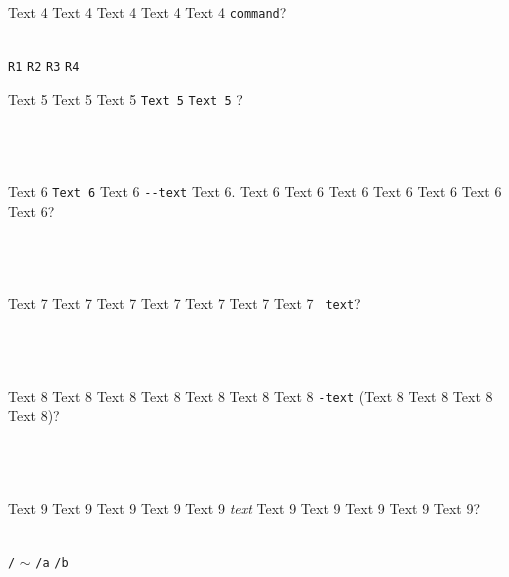 \documentclass[9pt]{exam}
\begin{document}
\begin{questions}
\question
    Text 4 Text 4 Text 4 Text 4 Text 4 \texttt{command}?\\\\
    \begin{oneparchoices}
     \choice \texttt{R1}
     \choice \texttt{R2}
     \choice \texttt{R3}
     \choice \texttt{R4}
    \end{oneparchoices}

\question
    Text 5 Text 5 Text 5 \textquotedbl{}\texttt{Text 5}\textquotedbl{} 
    \textquotedbl{}\texttt{Text 5}\textquotedbl{} ?\\\\
    \makebox[0.9\textwidth]{\$ \enspace\hrulefill}\\\\
    \makebox[0.9\textwidth]{\enspace\hrulefill}

\question
    Text 6 \texttt{Text 6} Text 6 \texttt{-{}-text} Text 6.
    Text 6 Text 6 Text 6 Text 6 Text 6 Text 6 Text 6?\\\\
    \makebox[0.9\textwidth]{\$ \enspace\hrulefill}\\\\
    \makebox[0.9\textwidth]{\enspace\hrulefill}

\question
    Text 7 Text 7 Text 7 Text 7 Text 7 Text 7 Text 7
    \texttt{\textquotesingle{} text\textquotesingle{}}?\\\\
    \makebox[0.9\textwidth]{\$ \enspace\hrulefill}\\\\
    \makebox[0.9\textwidth]{\enspace\hrulefill}

\question
    Text 8 Text 8 Text 8 Text 8 Text 8 Text 8 Text 8
    \texttt{\textquotesingle{}-text\textquotesingle{}}
    (Text 8 Text 8 Text 8 Text 8)?\\\\
    \makebox[0.9\textwidth]{\$ \enspace\hrulefill}\\\\
    \makebox[0.9\textwidth]{\enspace\hrulefill}

\question
    Text 9 Text 9 Text 9 Text 9 Text 9 \emph{text}
    Text 9 Text 9 Text 9 Text 9 Text 9?\\\\
    \begin{oneparchoices}
     \choice \texttt{/}
     \choice \texttt{$\sim$}
     \choice \texttt{/a}
     \choice \texttt{/b}
    \end{oneparchoices}


\end{questions}
\end{document}
